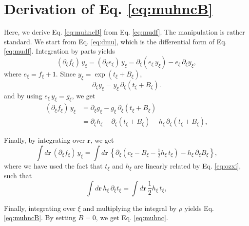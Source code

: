\documentclass[notitlepage, preprint]{revtex4-1}
\newcommand{\vct}[1]{\mathbf{#1}}
\providecommand{\vr}{} %
\renewcommand{\vr}{\vct{r}}
\begin{document}
\appendix



\section{\label{sec:muhncB} Derivation of Eq. \eqref{eq:muhncB}}


Here, we derive Eq. \eqref{eq:muhncB} from Eq. \eqref{eq:mudf}.
%
The manipulation is rather standard\cite{singer1985}.
%
We start from Eq. \eqref{eq:dmu},
which is the differential form of Eq. \eqref{eq:mudf}.
%
Integration by parts yields
\[
(\partial_\xi f_\xi) \, y_\xi
=
(\partial_\xi e_\xi) \, y_\xi
= \partial_\xi ( e_\xi \, y_\xi )
- e_\xi \, \partial_\xi y_\xi,
\]
where $e_\xi = f_\xi + 1$.
%
Since $y_\xi = \exp( t_\xi + B_\xi )$,
\[
  \partial_\xi y_\xi = y_\xi \, \partial_\xi( t_\xi + B_\xi).
\]
and by using $e_\xi \, y_\xi = g_\xi$, we get
\begin{align*}
(\partial_\xi f_\xi) \, y_\xi
&= \partial_\xi g_\xi
- g_\xi \, \partial_\xi (t_\xi + B_\xi)
\\
&= \partial_\xi h_\xi
- \partial_\xi (t_\xi + B_\xi)
- h_\xi \, \partial_\xi (t_\xi + B_\xi),
\end{align*}


Finally, by integrating over $\vr$, we get
\[
\int d\vr \, (\partial_\xi f_\xi) \, y_\xi
=
\int d\vr \, \left\{
  \partial_\xi (c_\xi - B_\xi - \tfrac{1}{2} h_\xi \, t_\xi)
- h_\xi \, \partial_\xi B_\xi \right\},
\]
where we have used the fact that
$t_\xi$ and $h_\xi$ are linearly related by
Eq. \eqref{eq:ozxi}, such that
\[
\int d\vr \, h_\xi \, \partial_\xi t_\xi
= \int d\vr \, \frac{1}{2} h_\xi \, t_\xi,
\]

Finally, integrating over $\xi$
and multiplying the integral by $\rho$
yields Eq. \eqref{eq:muhncB}.
%
By setting $B = 0$, we get Eq. \eqref{eq:muhnc}.




%
\end{document}
